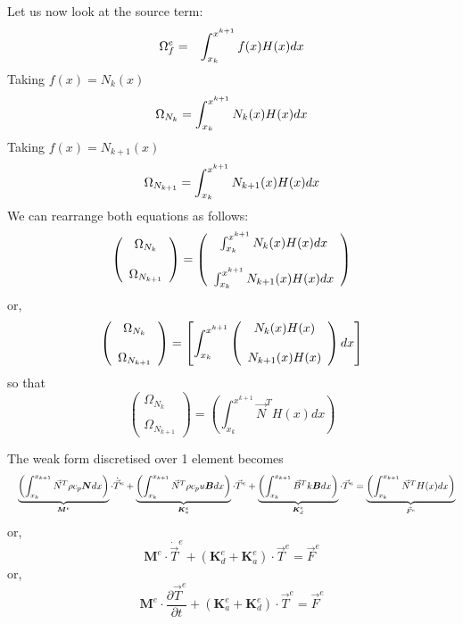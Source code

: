 Let us now look at the source term:
\begin{eqnarray}
{\Omega}_f^e &=&
\int_{x_k}^{x^{k+1}} f(x) H(x) dx \nonumber
\end{eqnarray}
Taking $f(x)=N_k(x)$ 
\[
{\Omega}_{N_k}=
\int_{x_k}^{x^{k+1}} N_k(x) H(x) dx \nonumber
\]
Taking $f(x)=N_{k+1}(x)$ 
\[
{\Omega}_{N_{k+1}}=
\int_{x_k}^{x^{k+1}} N_{k+1}(x) H(x) dx \nonumber
\]
We can rearrange both equations as follows:
\[
\left(
\begin{array}{cc}
 {\Omega}_{N_k} \\ \\ {\Omega}_{N_{k+1}}
\end{array}
\right)
=
\left(
\begin{array}{cc}
\int_{x_k}^{x^{k+1}} N_k(x) H(x) dx \nonumber \\ \\ 
\int_{x_k}^{x^{k+1}} N_{k+1}(x) H(x) dx \nonumber
\end{array}
\right)
\]
or,
\[
\left(
\begin{array}{cc}
 {\Omega}_{N_k} \\ \\ {\Omega}_{N_{k+1}}
\end{array}
\right)
=
\left[
\int_{x_k}^{x^{k+1}}
\left(
\begin{array}{cc}
N_k(x)  H(x)  \nonumber \\ \\ 
N_{k+1}(x) H(x)  \nonumber
\end{array}
\right)
dx
\right]
\]
so that 
\[
\left(
\begin{array}{cc}
 {\Omega}_{N_k} \\ \\ {\Omega}_{N_{k+1}}
\end{array}
\right)
=
\left(
\int_{x_k}^{x^{k+1}}
{\vec N}^T H(x) dx
\right)
\]

The weak form discretised over 1 element becomes
\begin{eqnarray}
&&\underbrace{\left( \int_{x_k}^{x_{k+1}}   {\vec N}^T \rho c_p {\bm N} dx  \right) }_{\bm M^e} \cdot \dot{\vec T}^e
+
\underbrace{\left( \int_{x_k}^{x_{k+1}}   {\vec N}^T \rho c_p u {\bm B} dx  \right)}_{{\bm K}_a^e} \cdot {\vec T}^e 
 +
\underbrace{\left( \int_{x_k}^{x_{k+1}}   {\vec B}^T k {\bm B} dx  \right)}_{{\bm K}_d^e} \cdot {\vec T}^e 
=
\underbrace{\left( \int_{x_k}^{x_{k+1}}   {\vec N}^T H(x) dx \right)}_{{\vec F}^e} \nonumber 
\end{eqnarray}
or,
\[
\boxed{
{\bm M}^e \cdot \dot{\vec T}^e + ({\bm K}_d^e + {\bm K}_a^e)\cdot {\vec T}^e = {\vec F}^e
}
\]
or,
\[
\boxed{
{\bm M}^e \cdot \frac{\partial {\vec T}^e}{\partial t} + ({\bm K}_a^e + {\bm K}_d^e) \cdot {\vec T}^e = {\vec F}^e
}
\]











